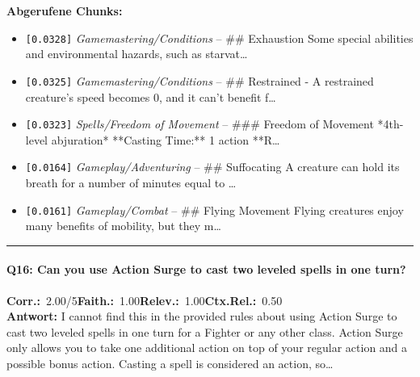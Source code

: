 \noindent\textbf{Abgerufene Chunks:}
\begin{itemize}[noitemsep, topsep=2pt]
  \item[\textbf{\#1}] \texttt{[0.0328]} \textit{Gamemastering/Conditions} -- \#\# Exhaustion  Some special abilities and environmental hazards, such as starvat\ldots
  \item[\textbf{\#2}] \texttt{[0.0325]} \textit{Gamemastering/Conditions} -- \#\# Restrained  - A restrained creature's speed becomes 0, and it can't benefit f\ldots
  \item[\textbf{\#3}] \texttt{[0.0323]} \textit{Spells/Freedom of Movement} -- \#\#\# Freedom of Movement  *4th-level abjuration*  **Casting Time:** 1 action  **R\ldots
  \item[\textbf{\#4}] \texttt{[0.0164]} \textit{Gameplay/Adventuring} -- \#\# Suffocating  A creature can hold its breath for a number of minutes equal to \ldots
  \item[\textbf{\#5}] \texttt{[0.0161]} \textit{Gameplay/Combat} -- \#\# Flying Movement  Flying creatures enjoy many benefits of mobility, but they m\ldots
\end{itemize}
\vspace{4pt}
\hrule
\vspace{6pt}

\paragraph{Q16: Can you use Action Surge to cast two leveled spells in one turn?}
\noindent \textbf{Corr.:}~2.00/5\quad \textbf{Faith.:}~1.00\quad \textbf{Relev.:}~1.00\quad \textbf{Ctx.Rel.:}~0.50\\

\noindent\textbf{Antwort:} I cannot find this in the provided rules about using Action Surge to cast two leveled spells in one turn for a Fighter or any other class. Action Surge only allows you to take one additional action on top of your regular action and a possible bonus action. Casting a spell is considered an action, so\ldots


